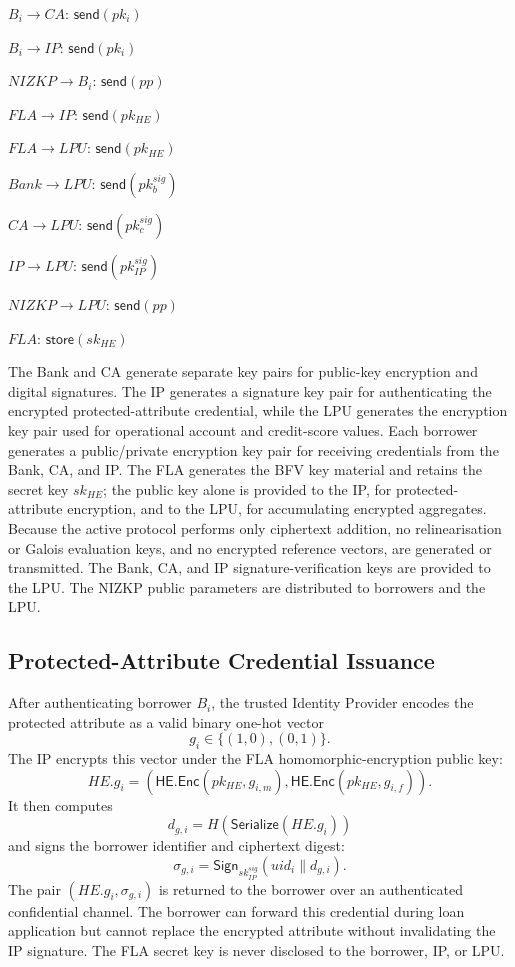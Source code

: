 \documentclass[a4paper,fleqn]{cas-dc}
\begin{document}
\begin{algorithm}[t]
\begin{algorithmic}[1]
    \State $B_i\rightarrow CA$:
    $\mathsf{send}(pk_i)$

    \State $B_i\rightarrow IP$:
    $\mathsf{send}(pk_i)$

    \State $NIZKP\rightarrow B_i$:
    $\mathsf{send}(pp)$

\EndFor

\State $FLA\rightarrow IP$:
$\mathsf{send}(pk_{HE})$

\State $FLA\rightarrow LPU$:
$\mathsf{send}
\left(
pk_{HE}
\right)$

\State $Bank\rightarrow LPU$:
$\mathsf{send}(pk_b^{sig})$

\State $CA\rightarrow LPU$:
$\mathsf{send}(pk_c^{sig})$

\State $IP\rightarrow LPU$:
$\mathsf{send}(pk_{IP}^{sig})$

\State $NIZKP\rightarrow LPU$:
$\mathsf{send}(pp)$

\State $FLA$:
$\mathsf{store}(sk_{HE})$

\end{algorithmic}
\end{algorithm}

The Bank and CA generate separate key pairs for public-key encryption and digital signatures. The IP generates a signature key pair for authenticating the encrypted protected-attribute credential, while the LPU generates the encryption key pair used for operational account and credit-score values. Each borrower generates a public/private encryption key pair for receiving credentials from the Bank, CA, and IP. The FLA generates the BFV key material and retains the secret key $sk_{HE}$; the public key alone is provided to the IP, for protected-attribute encryption, and to the LPU, for accumulating encrypted aggregates. Because the active protocol performs only ciphertext addition, no relinearisation or Galois evaluation keys, and no encrypted reference vectors, are generated or transmitted. The Bank, CA, and IP signature-verification keys are provided to the LPU. The NIZKP public parameters are distributed to borrowers and the LPU.

\subsection{Protected-Attribute Credential Issuance} 
\label{subsec:gender_credential} 

After authenticating borrower $B_i$, the trusted Identity Provider encodes the protected attribute as a valid binary one-hot vector \[ g_i\in\{(1,0),(0,1)\}. \] The IP encrypts this vector under the FLA homomorphic-encryption public key: 
\[ HE.g_i = \left( \mathsf{HE.Enc}(pk_{HE},g_{i,m}), \mathsf{HE.Enc}(pk_{HE},g_{i,f}) \right). \] It then computes \[ d_{g,i} = H(\mathsf{Serialize}(HE.g_i)) \] and signs the borrower identifier and ciphertext digest: \[ \sigma_{g,i} = \mathsf{Sign}_{sk_{IP}^{sig}} (uid_i\parallel d_{g,i}). \] The pair $(HE.g_i,\sigma_{g,i})$ is returned to the borrower over an authenticated confidential channel. The borrower can forward this credential during loan application but cannot replace the encrypted attribute without invalidating the IP signature. The FLA secret key is never disclosed to the borrower, IP, or LPU.
\end{document}
